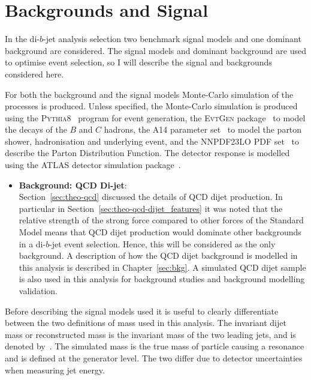 \section{Backgrounds and Signal}
\label{sec:evt-s+b}

In the di-$b$-jet analysis selection two
benchmark signal models and one dominant background are considered.
The signal models and dominant background are
used to optimise event selection, so I will describe
the signal and backgrounds considered here.

For both the background and the signal models Monte-Carlo simulation of the processes is produced.
Unless specified, the Monte-Carlo simulation is produced using
the \textsc{Pythia8}~\cite{dibjet-pythia8} program for event generation,
the \textsc{EvtGen} package~\cite{trig-evtGen} to model the decays of the $B$ and $C$ hadrons,
the A14 parameter set~\cite{dibjet-a14} to model the parton shower, hadronisation and underlying event,
and the NNPDF23LO PDF set~\cite{dibjet-nnpdf} to describe the Parton Distribution Function.
The detector response is modelled using the ATLAS detector simulation package~\cite{dijet-sim_ATLAS}.

\begin{itemize}[leftmargin=*]
\item\textbf{Background: QCD Di-jet}:  \vspace{1em} \\
  Section~\ref{sec:theo-qcd} discussed the details of QCD dijet production.
  In particular in Section~\ref{sec:theo-qcd-dijet_features} it was noted that the
  relative strength of the strong force compared to other forces
  of the Standard Model means that
  QCD dijet production would dominate other backgrounds in a di-$b$-jet event selection.
  Hence, this will be considered as the only background.
  A description of how the QCD dijet background is modelled in this analysis is described in Chapter~\ref{sec:bkg}.
  A simulated QCD dijet sample is also used in this analysis
  for background studies and background modelling validation.
  \end{itemize}

\noindent
Before describing the signal models used it is useful to clearly differentiate between the two definitions of mass used in this analysis.
The invariant dijet mass or reconstructed mass is the invariant mass of the two leading jets, and is denoted by~\mjj.
The simulated mass is the true mass of particle causing a resonance and is defined at the generator level.
The two differ due to detector uncertainties when measuring jet energy.

